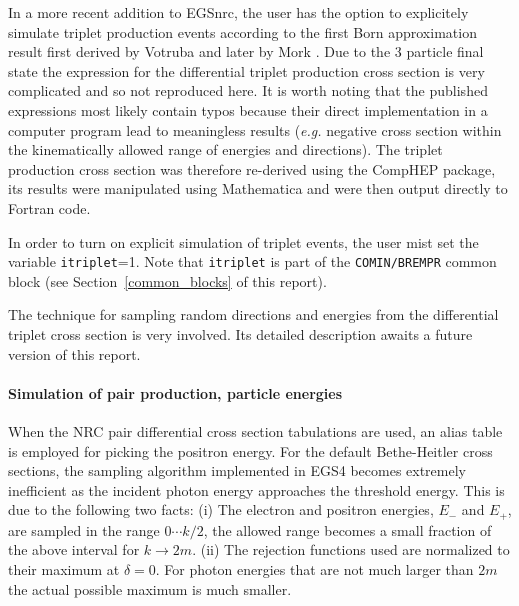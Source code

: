 In a more recent addition to EGSnrc, the user has the option 
to explicitely simulate triplet production events according to the 
first Born approximation result first derived by Votruba \cite{Vo48} 
and later by Mork \cite{Mo67}. Due to the 3 particle final state the 
expression for the differential triplet production cross section 
is very complicated and so not reproduced here. It is worth 
noting that the published expressions most likely contain typos 
because their direct implementation in a computer program 
lead to meaningless results ({\em e.g.} negative cross section within 
the kinematically allowed range of energies and directions). 
The triplet production cross section was therefore re-derived using 
the CompHEP package, its results were manipulated using Mathematica and 
were then output directly to Fortran code. 

In order to turn on explicit simulation of triplet events, the user 
mist set the variable {\tt itriplet}=1. Note that
{\tt itriplet} is part of the {\tt COMIN/BREMPR} common block
(see Section~\ref{common_blocks} of this report).

The technique for sampling random directions and energies from 
the differential triplet cross section is very involved. 
Its detailed description awaits a future version of this report. 


\paragraph{Simulation of pair production, particle energies}\hfill
{}

When the NRC pair differential cross section tabulations are used, 
an alias table is employed for picking the positron energy. 
For the default Bethe-Heitler cross sections, 
the sampling algorithm implemented in EGS4 becomes extremely 
inefficient as the incident photon energy approaches the 
threshold energy. This is due to the following two facts: 
(i) The electron and positron energies, $E_-$ and $E_+$, 
are sampled in the range $0\cdots k/2$, the allowed 
range becomes a small fraction of the above interval for 
$k \to 2 m$. (ii) The rejection functions used are normalized 
to their maximum at $\delta = 0$. For photon energies that 
are not much larger than $2 m$ the actual possible maximum 
is much smaller.

